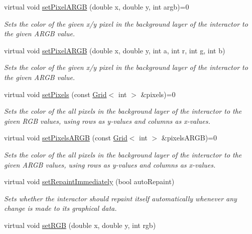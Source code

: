 \begin{DoxyCompactItemize}
virtual void \mbox{\hyperlink{classGDrawingSurface_ab2f7c5a9462f552ad3f30d23c04605dd}{set\+Pixel\+A\+R\+GB}} (double x, double y, int argb)=0
\begin{DoxyCompactList}\small\item\em Sets the color of the given x/y pixel in the background layer of the interactor to the given A\+R\+GB value. \end{DoxyCompactList}\item 
virtual void \mbox{\hyperlink{classGDrawingSurface_a62a8b1555ae3a073a84b0a1c071c65b1}{set\+Pixel\+A\+R\+GB}} (double x, double y, int a, int r, int g, int b)
\begin{DoxyCompactList}\small\item\em Sets the color of the given x/y pixel in the background layer of the interactor to the given A\+R\+GB value. \end{DoxyCompactList}\item 
virtual void \mbox{\hyperlink{classGDrawingSurface_aa80f4b7381bd418116baee600eed37fe}{set\+Pixels}} (const \mbox{\hyperlink{classGrid}{Grid}}$<$ int $>$ \&pixels)=0
\begin{DoxyCompactList}\small\item\em Sets the color of the all pixels in the background layer of the interactor to the given R\+GB values, using rows as y-\/values and columns as x-\/values. \end{DoxyCompactList}\item 
virtual void \mbox{\hyperlink{classGDrawingSurface_a7d813f0f29751a217201f24cef402306}{set\+Pixels\+A\+R\+GB}} (const \mbox{\hyperlink{classGrid}{Grid}}$<$ int $>$ \&pixels\+A\+R\+GB)=0
\begin{DoxyCompactList}\small\item\em Sets the color of the all pixels in the background layer of the interactor to the given A\+R\+GB values, using rows as y-\/values and columns as x-\/values. \end{DoxyCompactList}\item 
virtual void \mbox{\hyperlink{classGDrawingSurface_abf5590a3992dcb7896ed449e65961da3}{set\+Repaint\+Immediately}} (bool auto\+Repaint)
\begin{DoxyCompactList}\small\item\em Sets whether the interactor should repaint itself automatically whenever any change is made to its graphical data. \end{DoxyCompactList}\item 
virtual void \mbox{\hyperlink{classGDrawingSurface_a8bcbd65fa784bdab1e66a9efd381162d}{set\+R\+GB}} (double x, double y, int rgb)

\end{DoxyCompactItemize}
